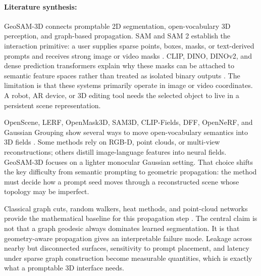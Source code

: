 \documentclass{article}
\begin{document}
\paragraph{Literature synthesis:}
GeoSAM-3D connects promptable 2D segmentation, open-vocabulary 3D perception, and graph-based propagation. SAM and SAM 2 establish the interaction primitive: a user supplies sparse points, boxes, masks, or text-derived prompts and receives strong image or video masks \citep{kirillov2023segment,ravi2024sam2}. CLIP, DINO, DINOv2, and dense prediction transformers explain why these masks can be attached to semantic feature spaces rather than treated as isolated binary outputs \citep{radford2021clip,caron2021dino,oquab2023dinov2,ranftl2021vision}. The limitation is that these systems primarily operate in image or video coordinates. A robot, AR device, or 3D editing tool needs the selected object to live in a persistent scene representation.

OpenScene, LERF, OpenMask3D, SAM3D, CLIP-Fields, DFF, OpenNeRF, and Gaussian Grouping show several ways to move open-vocabulary semantics into 3D fields \citep{peng2023openscene,kerr2023lerf,takmaz2023openmask3d,yang2023sam3d,ha2022clipfields,kobayashi2022dff,opennerf2024,ye2023gaussian}. Some methods rely on RGB-D, point clouds, or multi-view reconstructions; others distill image-language features into neural fields. GeoSAM-3D focuses on a lighter monocular Gaussian setting. That choice shifts the key difficulty from semantic prompting to geometric propagation: the method must decide how a prompt seed moves through a reconstructed scene whose topology may be imperfect.

Classical graph cuts, random walkers, heat methods, and point-cloud networks provide the mathematical baseline for this propagation step \citep{boykov2001interactive,grady2006random,crane2013heat,qi2017pointnet,qi2017pointnetplusplus,choy20194dspconv,thomas2019kpconv,hu2020randla}. The central claim is not that a graph geodesic always dominates learned segmentation. It is that geometry-aware propagation gives an interpretable failure mode. Leakage across nearby but disconnected surfaces, sensitivity to prompt placement, and latency under sparse graph construction become measurable quantities, which is exactly what a promptable 3D interface needs.
\end{document}
